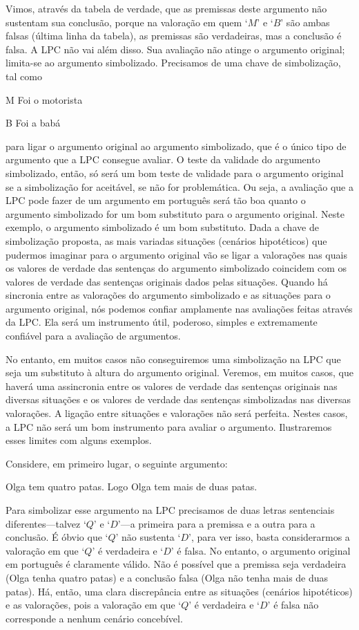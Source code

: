 Vimos, através da tabela de verdade, que as premissas deste argumento não sustentam sua conclusão, porque na valoração em quem `$M$' e `$B$' são ambas falsas (última linha da tabela), as premissas são verdadeiras, mas a conclusão é falsa.  
A LPC não vai além disso.
Sua avaliação não atinge o argumento original; limita-se ao argumento simbolizado.
Precisamos de uma chave de simbolização, tal como
\begin{ekey}
	\item[M] Foi o motorista
	\item[B] Foi a babá
\end{ekey}
para ligar o argumento original ao argumento simbolizado, que é o único tipo de argumento que a LPC consegue avaliar.
O teste da validade do argumento simbolizado, então, só será um bom teste de validade para o argumento original se a simbolização for aceitável, se não for problemática.
Ou seja, a avaliação que a LPC pode fazer de um argumento em português será tão boa quanto o argumento simbolizado for um bom substituto para o argumento original.
Neste exemplo, o argumento simbolizado é um bom substituto.
Dada a chave de simbolização proposta, as mais variadas situações (cenários hipotéticos) que pudermos imaginar para o argumento original vão se ligar a valorações nas quais os valores de verdade das sentenças do argumento simbolizado coincidem com os valores de verdade das sentenças originais dados pelas situações.
Quando há sincronia entre as valorações do argumento simbolizado e as situações para o argumento original, nós podemos confiar amplamente nas avaliações feitas através da LPC.
Ela será um instrumento útil, poderoso, simples e extremamente confiável para a avaliação de argumentos.

No entanto, em muitos casos não conseguiremos uma simbolização na LPC que seja um substituto à altura do argumento original.
Veremos, em muitos casos, que haverá uma assincronia entre os valores de verdade das sentenças originais nas diversas situações e os valores de verdade das sentenças simbolizadas nas diversas valorações.
A ligação entre situações e valorações não será perfeita.
Nestes casos, a LPC não será um bom instrumento para avaliar o argumento.
Ilustraremos esses limites com alguns exemplos.

Considere, em primeiro lugar, o seguinte argumento:
	\begin{earg}
		\item Olga tem quatro patas. Logo Olga tem mais de duas patas.
	\end{earg}
Para simbolizar esse argumento na LPC precisamos de duas letras sentenciais diferentes---talvez `$Q$' e `$D$'---a primeira para a premissa e a outra para a conclusão.
É óbvio que `$Q$' não sustenta `$D$', para ver isso, basta considerarmos a valoração em que `$Q$' é verdadeira e `$D$' é falsa.
No entanto, o argumento original em português é claramente válido.
Não é possível que a premissa seja verdadeira (Olga tenha quatro patas) e a conclusão falsa (Olga não tenha mais de duas patas).
Há, então, uma clara discrepância entre as situações (cenários hipotéticos) e as valorações, pois a valoração em que `$Q$' é verdadeira e `$D$' é falsa não corresponde a nenhum cenário concebível.

